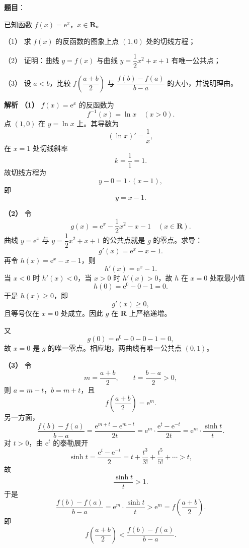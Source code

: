 \begin{answer}

\textbf{题目}：

已知函数 $f(x)=\mathrm e^x$，$x\in\mathbf R$。

（1） 求 $f(x)$ 的反函数的图象上点 $(1,0)$ 处的切线方程；

（2） 证明：曲线 $y=f(x)$ 与曲线 $y=\dfrac12x^2+x+1$ 有唯一公共点；

（3） 设 $a<b$，比较 $f\left(\dfrac{a+b}{2}\right)$ 与 $\dfrac{f(b)-f(a)}{b-a}$ 的大小，并说明理由。

\textbf{解析}
\textbf{（1）} $f(x)=\mathrm e^x$ 的反函数为
\nopagebreak[4]
\[f^{-1}(x)=\ln x\quad(x>0).\]
点 $(1,0)$ 在 $y=\ln x$ 上。其导数为
\nopagebreak[4]
\[\left(\ln x\right)'=\frac1x,\]
在 $x=1$ 处切线斜率
\nopagebreak[4]
\[k=\frac11=1.\]
故切线方程为
\nopagebreak[4]
\[y-0=1\cdot(x-1),\]
即
\nopagebreak[4]
\[y=x-1.\]

\textbf{（2）} 令
\nopagebreak[4]
\[g(x)=\mathrm e^x-\frac12x^2-x-1\quad(x\in\mathbf R).\]
曲线 $y=\mathrm e^x$ 与 $y=\dfrac12x^2+x+1$ 的公共点就是 $g$ 的零点。求导：
\nopagebreak[4]
\[g'(x)=\mathrm e^x-x-1.\]
再令 $h(x)=\mathrm e^x-x-1$，则
\nopagebreak[4]
\[h'(x)=\mathrm e^x-1.\]
当 $x<0$ 时 $h'(x)<0$，当 $x>0$ 时 $h'(x)>0$，故 $h$ 在 $x=0$ 处取最小值
\nopagebreak[4]
\[h(0)=\mathrm e^0-0-1=0.\]
于是 $h(x)\geqslant0$，即
\nopagebreak[4]
\[g'(x)\geqslant0,\]
且等号仅在 $x=0$ 处成立。因此 $g$ 在 $\mathbf R$ 上严格递增。

又
\nopagebreak[4]
\[g(0)=\mathrm e^0-0-0-1=0,\]
故 $x=0$ 是 $g$ 的唯一零点。相应地，两曲线有唯一公共点 $(0,1)$。

\textbf{（3）} 令
\nopagebreak[4]
\[m=\frac{a+b}{2},\qquad t=\frac{b-a}{2}>0,\]
则 $a=m-t$，$b=m+t$，且
\nopagebreak[4]
\[f\left(\frac{a+b}{2}\right)=\mathrm e^m.\]
另一方面，
\nopagebreak[4]
\[\frac{f(b)-f(a)}{b-a}=\frac{\mathrm e^{m+t}-\mathrm e^{m-t}}{2t}
=\mathrm e^m\cdot\frac{\mathrm e^{t}-\mathrm e^{-t}}{2t}
=\mathrm e^m\cdot\frac{\sinh t}{t}.\]
对 $t>0$，由 $\mathrm e^t$ 的泰勒展开
\nopagebreak[4]
\[\sinh t=\frac{\mathrm e^t-\mathrm e^{-t}}2=t+\frac{t^3}{3!}+\frac{t^5}{5!}+\cdots>t,\]
故
\nopagebreak[4]
\[\frac{\sinh t}{t}>1.\]
于是
\nopagebreak[4]
\[\frac{f(b)-f(a)}{b-a}=\mathrm e^m\cdot\frac{\sinh t}{t}>\mathrm e^m=f\left(\frac{a+b}{2}\right).\]
即
\nopagebreak[4]
\[f\left(\frac{a+b}{2}\right)<\frac{f(b)-f(a)}{b-a}.\]




\end{answer}